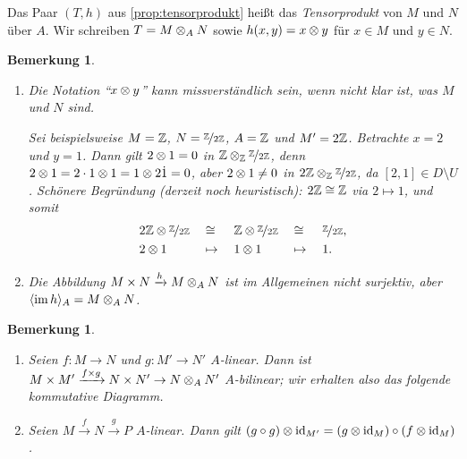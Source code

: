\documentclass[12pt,a4paper]{scrartcl}
\theoremstyle{cplain}
\theoremstyle{cdef}
\newtheorem{beme}[thmcounter]{Bemerkung}
\begin{document}
\begin{defi}
	Das Paar $(T,h)$ aus \cref{prop:tensorprodukt} heißt das \emph{Tensorprodukt} von $M$ und $N$ über $A$. Wir schreiben $T = M \otimes_A  N$ sowie $h(x,y) = x \otimes y$ für $x \in M$ und $y \in N$.
\end{defi}
\begin{beme}
	\leavevmode
	\begin{enumerate}
		\item Die Notation \enquote{$x \otimes y$} kann missverständlich sein, wenn nicht klar ist, was $M$ und $N$ sind.

		Sei beispielsweise $M=\mathbb Z$, $N= \nicefrac{\mathbb Z}{2\mathbb Z}$, $A = \mathbb Z$ und $M' = 2 \mathbb Z$. Betrachte $x=2$ und $y=1$. Dann gilt $2 \otimes 1 = 0$ in $\mathbb Z \otimes_\mathbb Z \nicefrac{\mathbb Z}{2\mathbb Z}$, denn $2 \otimes 1 = 2 \cdot 1 \otimes 1 = 1 \otimes 2 \dot 1 = 0$, aber $2 \otimes 1 \neq 0$ in $2\mathbb Z \otimes_\mathbb Z \nicefrac{\mathbb Z}{2 \mathbb Z}$, da $[2,1] \in D \setminus U$. Schönere Begründung (derzeit noch heuristisch): $2\mathbb Z \cong \mathbb Z$ via $2 \mapsto 1$, und somit
		\begin{alignat*}{5}
			&2\mathbb Z \otimes \nicefrac{\mathbb Z}{2\mathbb Z} &&\cong &&\mathbb Z \otimes \nicefrac{\mathbb Z}{2\mathbb Z} &&\cong &&\nicefrac{\mathbb Z}{2\mathbb Z}, \\
			&2 \otimes 1 &&\mapsto\; &&1 \otimes 1 &&\mapsto\; &&1.
		\end{alignat*}
		\item Die Abbildung $M \times N \xrightarrow{h} M \otimes_A N$ ist im Allgemeinen nicht surjektiv, aber $\langle\operatorname{im} h\rangle_A = M \otimes_A N$.
	\end{enumerate}
\end{beme}
\begin{beme}
	\leavevmode
	\begin{enumerate}
		\item Seien $f: M \to N$ und $g: M' \to N'$ $A$-linear. Dann ist $M \times M' \xrightarrow{f \times g} N \times N' \to N \otimes_A N'$ $A$-bilinear; wir erhalten also das folgende kommutative Diagramm.
		\begin{figure}[H]
			\centering
		\end{figure}
		\item Seien $M \xrightarrow{f} N \xrightarrow{g} P$ $A$-linear. Dann gilt $(g \circ g) \otimes \operatorname{id}_{M'} = (g \otimes \operatorname{id}_{M}) \circ (f \otimes \operatorname{id}_{M})$.
	\end{enumerate}
\end{beme}
\end{document}
